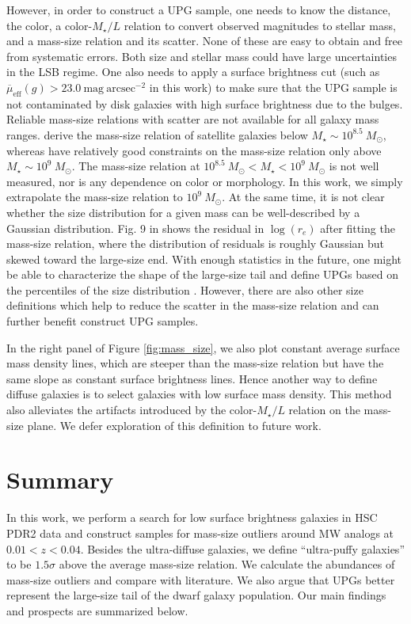 \documentclass[twocolumn,astrosymb,twocolappendix]{aastex631}
\newcommand{\sbunit}{\mathrm{mag\ arcsec}^{-2}}
\newcommand{\sbeff}{\overline{\mu}_{\mathrm{eff}}(g)}
\begin{document}
\begin{CJK*}{UTF8}{gbsn}
However, in order to construct a UPG sample, one needs to know the distance, the color, a color-$M_\star/L$ relation to convert observed magnitudes to stellar mass, and a mass-size relation and its scatter. None of these are easy to obtain and free from systematic errors. Both size and stellar mass could have large uncertainties in the LSB regime. One also needs to apply a surface brightness cut (such as $\sbeff > 23.0\ \sbunit$ in this work) to make sure that the UPG sample is not contaminated by disk galaxies with high surface brightness due to the bulges. Reliable mass-size relations with scatter are not available for all galaxy mass ranges. \citet{ELVES-I} derive the mass-size relation of satellite galaxies below $M_\star \sim 10^{8.5}\ M_\odot$, whereas \citet{Lange2015} have relatively good constraints on the mass-size relation only above $M_\star \sim 10^{9}\ M_\odot$. The mass-size relation at $10^{8.5}\ M_\odot < M_\star < 10^{9}\ M_\odot$ is not well measured, nor is any dependence on color or morphology. In this work, we simply extrapolate the \citet{ELVES-I} mass-size relation to $10^9\ M_\odot$. At the same time, it is not clear whether the size distribution for a given mass can be well-described by a Gaussian distribution. Fig. 9 in \citet{ELVES-I} shows the residual in $\log(r_e)$ after fitting the mass-size relation, where the distribution of residuals is roughly Gaussian but skewed toward the large-size end. With enough statistics in the future, one might be able to characterize the shape of the large-size tail and define UPGs based on the percentiles of the size distribution \citep{Greene2022}. However, there are also other size definitions which help to reduce the scatter in the mass-size relation \citep[e.g.,][]{Miller2019,Mowla2019,Trujillo2020,Chamba2022} and can further benefit construct UPG samples. 

In the right panel of Figure \ref{fig:mass_size}, we also plot constant average surface mass density lines, which are steeper than the mass-size relation but have the same slope as constant surface brightness lines. Hence another way to define diffuse galaxies is to select galaxies with low surface mass density. This method also alleviates the artifacts introduced by the color-$M_\star/L$ relation on the mass-size plane. We defer exploration of this definition to future work.  


\section{Summary}\label{sec:summary}
In this work, we perform a search for low surface brightness galaxies in HSC PDR2 data and construct samples for mass-size outliers around MW analogs at $0.01 < z < 0.04$. Besides the ultra-diffuse galaxies, we define ``ultra-puffy galaxies'' to be $1.5\sigma$ above the average mass-size relation. We calculate the abundances of mass-size outliers and compare with literature. We also argue that UPGs better represent the large-size tail of the dwarf galaxy population. Our main findings and prospects are summarized below. 


\end{CJK*}
\end{document}
